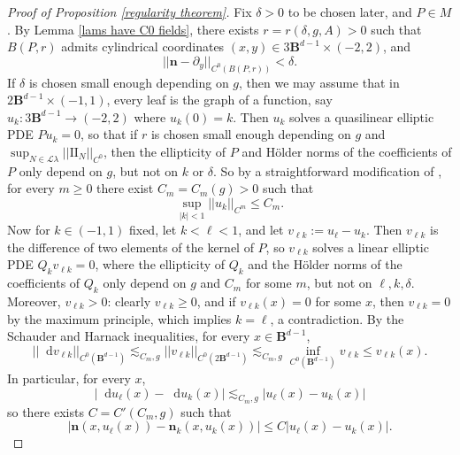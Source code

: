 \documentclass[reqno,11pt]{amsart}
\newcommand{\Ball}{\mathbf{B}}
\newcommand*\dif{\mathop{}\!\mathrm{d}}
\newcommand{\Leaves}{\mathscr L}
\newcommand{\Two}{\mathrm{I\!I}}
\newcommand{\normal}{\mathbf n}
\theoremstyle{definition}
\numberwithin{equation}{section}
\begin{document}
\begin{proof}[Proof of Proposition \ref{regularity theorem}]
Fix $\delta > 0$ to be chosen later, and $P \in M$.
By Lemma \ref{lams have C0 fields}, there exists $r = r(\delta, g, A) > 0$ such that $B(P, r)$ admits cylindrical coordinates $(x, y) \in 3\Ball^{d - 1} \times (-2, 2)$, and
\begin{equation}\label{normal is almost constant}
||\normal - \partial_y||_{C^0(B(P, r))} < \delta.
\end{equation}
If $\delta$ is chosen small enough depending on $g$, then we may assume that in $2\Ball^{d - 1} \times (-1, 1)$,
every leaf is the graph of a function, say $u_k: 3\Ball^{d - 1} \to (-2, 2)$ where $u_k(0) = k$.
Then $u_k$ solves a quasilinear elliptic PDE $Pu_k = 0$, so that if $r$ is chosen small enough depending on $g$ and $\sup_{N \in \Leaves \lambda} ||\Two_N||_{C^0}$, then the ellipticity of $P$ and H\"older norms of the coefficients of $P$ only depend on $g$, but not on $k$ or $\delta$.
So by a straightforward modification of \cite[Corollary 16.7]{gilbarg2015elliptic}, for every $m \geq 0$ there exist $C_m = C_m(g) > 0$ such that
\begin{equation}\label{norms on uk}
\sup_{|k| < 1} ||u_k||_{C^m} \leq C_m.
\end{equation}
Now for $k \in (-1, 1)$ fixed, let $k < \ell < 1$, and let $v_{\ell k} := u_\ell - u_k$.
Then $v_{\ell k}$ is the difference of two elements of the kernel of $P$, so $v_{\ell k}$ solves a linear elliptic PDE $Q_k v_{\ell k} = 0$, where the ellipticity of $Q_k$ and the H\"older norms of the coefficients of $Q_k$ only depend on $g$ and $C_m$ for some $m$, but not on $\ell, k, \delta$.
Moreover, $v_{\ell k} > 0$: clearly $v_{\ell k} \geq 0$, and if $v_{\ell k}(x) = 0$ for some $x$, then $v_{\ell k} = 0$ by the maximum principle, which implies $k = \ell$, a contradiction.
By the Schauder \cite[Theorem 6.2]{gilbarg2015elliptic} and Harnack \cite[Theorem 9.25]{gilbarg2015elliptic} inequalities, for every $x \in \Ball^{d - 1}$,
\begin{equation}\label{Schauder Harnack}
	||\dif v_{\ell k}||_{C^0(\Ball^{d - 1})} \lesssim_{C_m, g} ||v_{\ell k}||_{C^0(2 \Ball^{d - 1})} \lesssim_{C_m, g} \inf_{C^0(\Ball^{d - 1})} v_{\ell k} \leq v_{\ell k}(x).
\end{equation}
In particular, for every $x$,
$$|\dif u_\ell(x) - \dif u_k(x)| \lesssim_{C_m, g} |u_\ell(x) - u_k(x)|$$
so there exists $C = C'(C_m, g)$ such that
\begin{equation}\label{vertical Lipschitz}
|\normal(x, u_\ell(x)) - \normal_k(x, u_k(x))| \leq C |u_\ell(x) - u_k(x)|.
\end{equation}


\end{proof}
\end{document}
